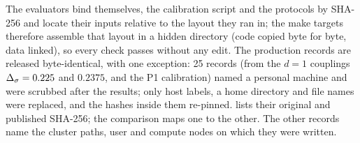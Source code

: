 The evaluators bind themselves, the calibration script and the protocols by SHA-256 and locate their inputs relative to the layout they ran in;
the make targets therefore assemble that layout in a hidden  directory (code copied byte for byte, data linked), so every check
passes without any edit. The production records are released byte-identical, with one exception: 25 records (from the $d=1$ couplings
$\Delta_\sigma=0.225$ and $0.2375$, and the P1 calibration) named a personal machine and were scrubbed after the results; only host labels, a home
directory and file names were replaced, and the hashes inside them re-pinned.  lists their original and published
SHA-256; the comparison maps one to the other. The other records name the cluster paths, user and compute nodes on which they were written.

